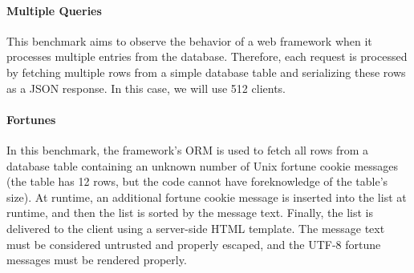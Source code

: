 \paragraph{Multiple Queries}
This benchmark aims to observe the behavior of a web framework when it processes multiple entries from the database.
Therefore, each request is processed by fetching multiple rows from a simple database table and serializing these rows as a JSON response.
In this case, we will use 512 clients.

\paragraph{Fortunes}
In this benchmark, the framework's ORM is used to fetch all rows from a database table containing an unknown number of Unix fortune cookie messages (the table has 12 rows, but the code cannot have foreknowledge of the table's size).
At runtime, an additional fortune cookie message is inserted into the list at runtime, and then the list is sorted by the message text.
Finally, the list is delivered to the client using a server-side HTML template.
The message text must be considered untrusted and properly escaped, and the UTF-8 fortune messages must be rendered properly.

